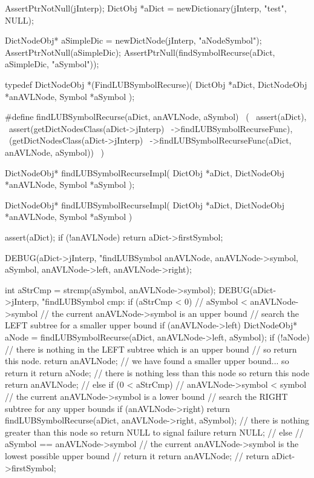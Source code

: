 \startCTest
  AssertPtrNotNull(jInterp);
  DictObj *aDict = newDictionary(jInterp, "test", NULL);

  DictNodeObj* aSimpleDic = newDictNode(jInterp, "aNodeSymbol");
  AssertPtrNotNull(aSimpleDic);
  AssertPtrNull(findSymbolRecurse(aDict, aSimpleDic, "aSymbol"));
\stopCTest
\stopTestCase
\stopTestSuite

\startTestSuite[findLUBSymbolRecurse]

\startCHeader
typedef DictNodeObj *(FindLUBSymbolRecurse)(
  DictObj     *aDict,
  DictNodeObj *anAVLNode,
  Symbol      *aSymbol
);

#define findLUBSymbolRecurse(aDict, anAVLNode, aSymbol)       \
  (                                                           \
    assert(aDict),                                            \
    assert(getDictNodesClass(aDict->jInterp)                  \
      ->findLUBSymbolRecurseFunc),                            \
    (getDictNodesClass(aDict->jInterp)                        \
      ->findLUBSymbolRecurseFunc(aDict, anAVLNode, aSymbol))  \
  )
\stopCHeader

\setCHeaderStream{private}
\startCHeader
DictNodeObj* findLUBSymbolRecurseImpl(
  DictObj     *aDict,
  DictNodeObj *anAVLNode,
  Symbol      *aSymbol
);
\stopCHeader
{}

\startCCode
DictNodeObj* findLUBSymbolRecurseImpl(
  DictObj     *aDict,
  DictNodeObj *anAVLNode,
  Symbol      *aSymbol
) {
  assert(aDict);
  if (!anAVLNode) return aDict->firstSymbol;

  DEBUG(aDict->jInterp,
        "findLUBSymbol %
        anAVLNode, anAVLNode->symbol, aSymbol,
        anAVLNode->left, anAVLNode->right);

  int aStrCmp = strcmp(aSymbol, anAVLNode->symbol);
  DEBUG(aDict->jInterp, "findLUBSymbol cmp: %
  if (aStrCmp < 0) {
    // aSymbol < anAVLNode->symbol
    // the current anAVLNode->symbol is an upper bound
    // search the LEFT subtree for a smaller upper bound
    if (anAVLNode->left) {
      DictNodeObj* aNode = findLUBSymbolRecurse(aDict, anAVLNode->left, aSymbol);
      if (!aNode) {
        // there is nothing in the LEFT subtree which is an upper bound
        // so return this node.
        return anAVLNode;
      }
      // we have found a smaller upper bound... so return it
      return aNode;
    }
    // there is nothing less than this node so return this node
    return anAVLNode;
    //
  } else if (0 < aStrCmp) {
    // anAVLNode->symbol < symbol
    // the current anAVLNode->symbol is a lower bound
    // search the RIGHT subtree for any upper bounds
    if (anAVLNode->right) {
      return findLUBSymbolRecurse(aDict, anAVLNode->right, aSymbol);
    }
    // there is nothing greater than this node so return NULL to signal failure
    return NULL;
    //
  } else {
    // aSymbol == anAVLNode->symbol
    // the current anAVLNode->symbol is the lowest possible upper bound
    // return it
    return anAVLNode;
    //
  }
  return aDict->firstSymbol;
}
\stopCCode
\stopTestSuite
